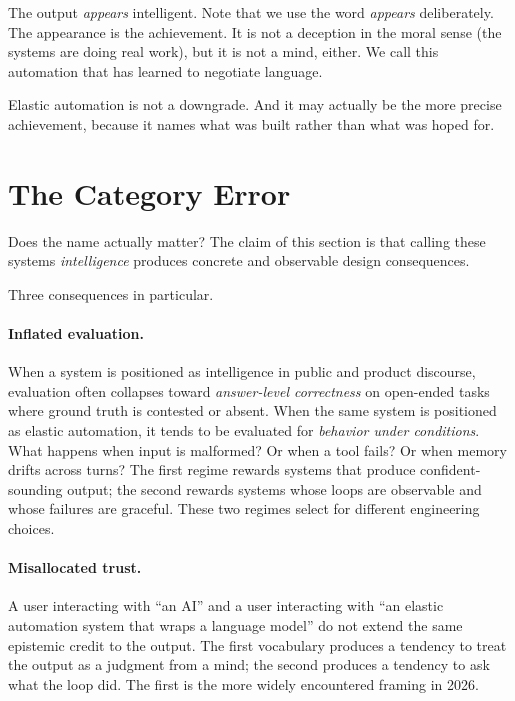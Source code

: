 \documentclass[11pt,a4paper]{article}
\begin{document}
The output \textit{appears} intelligent. Note that we use the word \textit{appears} deliberately. The appearance is the achievement. It is not a deception in the moral sense (the systems are doing real work), but it is not a mind, either. We call this automation that has learned to negotiate language.

Elastic automation is not a downgrade. And it may actually be the more precise achievement, because it names what was built rather than what was hoped for.

\section{The Category Error}\label{sec:category-error}

Does the name actually matter? The claim of this section is that calling these systems \textit{intelligence} produces concrete and observable design consequences.

Three consequences in particular.

\paragraph{Inflated evaluation.} When a system is positioned as intelligence in public and product discourse, evaluation often collapses toward \textit{answer-level correctness} on open-ended tasks where ground truth is contested or absent. When the same system is positioned as elastic automation, it tends to be evaluated for \textit{behavior under conditions}. What happens when input is malformed? Or when a tool fails? Or when memory drifts across turns? The first regime rewards systems that produce confident-sounding output; the second rewards systems whose loops are observable and whose failures are graceful. These two regimes select for different engineering choices.

\paragraph{Misallocated trust.} A user interacting with ``an AI'' and a user interacting with ``an elastic automation system that wraps a language model'' do not extend the same epistemic credit to the output. The first vocabulary produces a tendency to treat the output as a judgment from a mind; the second produces a tendency to ask what the loop did. The first is the more widely encountered framing in 2026.
\end{document}
